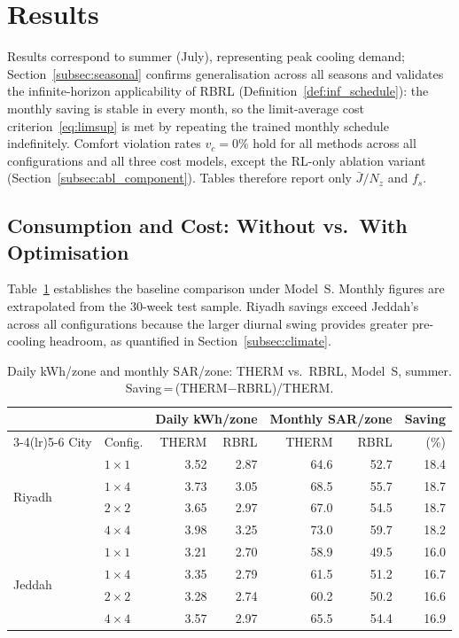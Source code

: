 \documentclass[12pt,a4paper]{article}
\let\oldsection\section
\renewcommand{\section}[1]{\FloatBarrier\oldsection{#1}}
\let\oldsubsection\subsection
\renewcommand{\subsection}[1]{\FloatBarrier\oldsubsection{#1}}
\newcommand{\Jbar}{\bar{J}}
\begin{document}
\section{Results}
\label{sec:results}

Results correspond to summer (July), representing peak cooling demand;
Section~\ref{subsec:seasonal} confirms generalisation across all
seasons and validates the infinite-horizon applicability of RBRL
(Definition~\ref{def:inf_schedule}): the monthly saving is stable in every
month, so the limit-average cost criterion~\eqref{eq:limsup} is met by
repeating the trained monthly schedule indefinitely.
Comfort violation rates $v_c=0\%$ hold for all methods across all
configurations and all three cost models, except the RL-only ablation
variant (Section~\ref{subsec:abl_component}).
Tables therefore report only $\Jbar/N_z$ and $f_s$.

\subsection{Consumption and Cost: Without vs.\ With Optimisation}
\label{subsec:consumption}

Table~\ref{tab:consumption} establishes the baseline comparison under
Model~S.
Monthly figures are extrapolated from the 30-week test sample.
Riyadh savings exceed Jeddah's across all configurations because the
larger diurnal swing provides greater pre-cooling headroom, as quantified
in Section~\ref{subsec:climate}.

\begin{table}[!t]
\centering
\caption{Daily kWh/zone and monthly SAR/zone: THERM vs.\ RBRL, Model~S,
summer. Saving\,=\,(THERM$-$RBRL)/THERM.}
\label{tab:consumption}
\setlength{\tabcolsep}{3.5pt}
\begin{tabularx}{\linewidth}{@{}lXrrrrr@{}}
\toprule
& & \multicolumn{2}{c}{Daily kWh/zone} &
    \multicolumn{2}{c}{Monthly SAR/zone} & Saving \\
\cmidrule(lr){3-4}\cmidrule(lr){5-6}
City & Config. & THERM & RBRL & THERM & RBRL & (\%) \\
\midrule
\multirow{4}{*}{Riyadh}
  & $1\times1$ & 3.52 & 2.87 & 64.6 & 52.7 & 18.4 \\
  & $1\times4$ & 3.73 & 3.05 & 68.5 & 55.7 & 18.7 \\
  & $2\times2$ & 3.65 & 2.97 & 67.0 & 54.5 & 18.7 \\
  & $4\times4$ & 3.98 & 3.25 & 73.0 & 59.7 & 18.2 \\
\midrule
\multirow{4}{*}{Jeddah}
  & $1\times1$ & 3.21 & 2.70 & 58.9 & 49.5 & 16.0 \\
  & $1\times4$ & 3.35 & 2.79 & 61.5 & 51.2 & 16.7 \\
  & $2\times2$ & 3.28 & 2.74 & 60.2 & 50.2 & 16.6 \\
  & $4\times4$ & 3.57 & 2.97 & 65.5 & 54.4 & 16.9 \\
\bottomrule
\end{tabularx}
\end{table}
\end{document}
